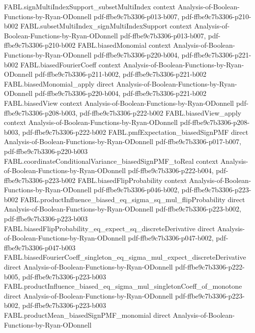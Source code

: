 \begin{theorem}
  {FABL.signMultiIndexSupport_subsetMultiIndex}
  {context}
  {Analysis-of-Boolean-Functions-by-Ryan-ODonnell}
  {pdf-ffbe9c7b3306-p013-b007,
    pdf-ffbe9c7b3306-p210-b002}
\proofstep
  {FABL.subsetMultiIndex_signMultiIndexSupport}
  {context}
  {Analysis-of-Boolean-Functions-by-Ryan-ODonnell}
  {pdf-ffbe9c7b3306-p013-b007,
    pdf-ffbe9c7b3306-p210-b002}
\proofstep
  {FABL.biasedMonomial}
  {context}
  {Analysis-of-Boolean-Functions-by-Ryan-ODonnell}
  {pdf-ffbe9c7b3306-p220-b004,
    pdf-ffbe9c7b3306-p221-b002}
\proofstep
  {FABL.biasedFourierCoeff}
  {context}
  {Analysis-of-Boolean-Functions-by-Ryan-ODonnell}
  {pdf-ffbe9c7b3306-p211-b002,
    pdf-ffbe9c7b3306-p221-b002}
\proofstep
  {FABL.biasedMonomial_apply}
  {direct}
  {Analysis-of-Boolean-Functions-by-Ryan-ODonnell}
  {pdf-ffbe9c7b3306-p220-b004,
    pdf-ffbe9c7b3306-p221-b002}
\proofstep
  {FABL.biasedView}
  {context}
  {Analysis-of-Boolean-Functions-by-Ryan-ODonnell}
  {pdf-ffbe9c7b3306-p208-b003,
    pdf-ffbe9c7b3306-p222-b002}
\proofstep
  {FABL.biasedView_apply}
  {context}
  {Analysis-of-Boolean-Functions-by-Ryan-ODonnell}
  {pdf-ffbe9c7b3306-p208-b003,
    pdf-ffbe9c7b3306-p222-b002}
\proofstep
  {FABL.pmfExpectation_biasedSignPMF}
  {direct}
  {Analysis-of-Boolean-Functions-by-Ryan-ODonnell}
  {pdf-ffbe9c7b3306-p017-b007,
    pdf-ffbe9c7b3306-p220-b003}
\proofstep
  {FABL.coordinateConditionalVariance_biasedSignPMF_toReal}
  {context}
  {Analysis-of-Boolean-Functions-by-Ryan-ODonnell}
  {pdf-ffbe9c7b3306-p222-b004,
    pdf-ffbe9c7b3306-p223-b002}
\proofstep
  {FABL.biasedFlipProbability}
  {context}
  {Analysis-of-Boolean-Functions-by-Ryan-ODonnell}
  {pdf-ffbe9c7b3306-p046-b002,
    pdf-ffbe9c7b3306-p223-b002}
\proofstep
  {FABL.productInfluence_biased_eq_sigma_sq_mul_flipProbability}
  {direct}
  {Analysis-of-Boolean-Functions-by-Ryan-ODonnell}
  {pdf-ffbe9c7b3306-p223-b002,
    pdf-ffbe9c7b3306-p223-b003}
\proofstep
  {FABL.biasedFlipProbability_eq_expect_sq_discreteDerivative}
  {direct}
  {Analysis-of-Boolean-Functions-by-Ryan-ODonnell}
  {pdf-ffbe9c7b3306-p047-b002,
    pdf-ffbe9c7b3306-p047-b003}
\proofstep
  {FABL.biasedFourierCoeff_singleton_eq_sigma_mul_expect_discreteDerivative}
  {direct}
  {Analysis-of-Boolean-Functions-by-Ryan-ODonnell}
  {pdf-ffbe9c7b3306-p222-b005,
    pdf-ffbe9c7b3306-p223-b003}
\proofstep
  {FABL.productInfluence_biased_eq_sigma_mul_singletonCoeff_of_monotone}
  {direct}
  {Analysis-of-Boolean-Functions-by-Ryan-ODonnell}
  {pdf-ffbe9c7b3306-p223-b002,
    pdf-ffbe9c7b3306-p223-b003}
\proofstep
  {FABL.productMean_biasedSignPMF_monomial}
  {direct}
  {Analysis-of-Boolean-Functions-by-Ryan-ODonnell}

\end{theorem}
